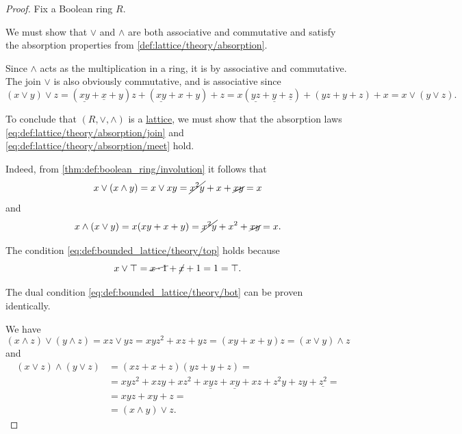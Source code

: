 \begin{proof}
  Fix a Boolean ring \( R \).

   We must show that \( {\vee} \) and \( {\wedge} \) are both associative and commutative and satisfy the absorption properties from \cref{def:lattice/theory/absorption}.

  Since \( {\wedge} \) acts as the multiplication in a ring, it is by associative and commutative. The join \( {\vee} \) is also obviously commutative, and is associative since
  \begin{equation*}
    (x \vee y) \vee z
    =
    (\underline{xy} + \underline{x} + y)z + (\underline{xy} + x + y) + z
    =
    x(\underline{yz} + \underline{y} + \underline{z}) + (yz + y + z) + x
    =
    x \vee (y \vee z).
  \end{equation*}

  To conclude that \( (R, \vee, \wedge) \) is a \hyperref[def:lattice]{lattice}, we must show that the absorption laws \eqref{eq:def:lattice/theory/absorption/join} and \eqref{eq:def:lattice/theory/absorption/meet} hold.

  Indeed, from \cref{thm:def:boolean_ring/involution} it follows that
  \begin{equation*}
    x \vee (x \wedge y)
    =
    x \vee xy
    =
    \cancel{x^2 y} + x + \cancel{xy}
    =
    x
  \end{equation*}
  and
  \begin{equation*}
    x \wedge (x \vee y)
    =
    x(xy + x + y)
    =
    \cancel{x^2 y} + x^2 + \cancel{xy}
    =
    x.
  \end{equation*}

   The condition \eqref{eq:def:bounded_lattice/theory/top} holds because
  \begin{equation*}
    x \vee \top
    =
    \cancel{x \cdot 1} + \cancel{x} + 1
    =
    1
    =
    \top.
  \end{equation*}

  The dual condition \eqref{eq:def:bounded_lattice/theory/bot} can be proven identically.

   We have
  \begin{equation*}
    (x \wedge z) \vee (y \wedge z)
    =
    xz \vee yz
    =
    xyz^2 + xz + yz
    =
    (xy + x + y)z
    =
    (x \vee y) \wedge z
  \end{equation*}
  and
  \begin{align*}
    (x \vee z) \wedge (y \vee z)
    &=
    (xz + x + z)(yz + y + z)
    = \\ &=
    xyz^2 + xzy + xz^2 + \underline{xyz} + \underline{xy} + xz + z^2y + zy + \underline{z^2}
    = \\ &=
    xyz + xy + z
    = \\ &=
    (x \wedge y) \vee z.
  \end{align*}


\end{proof}
